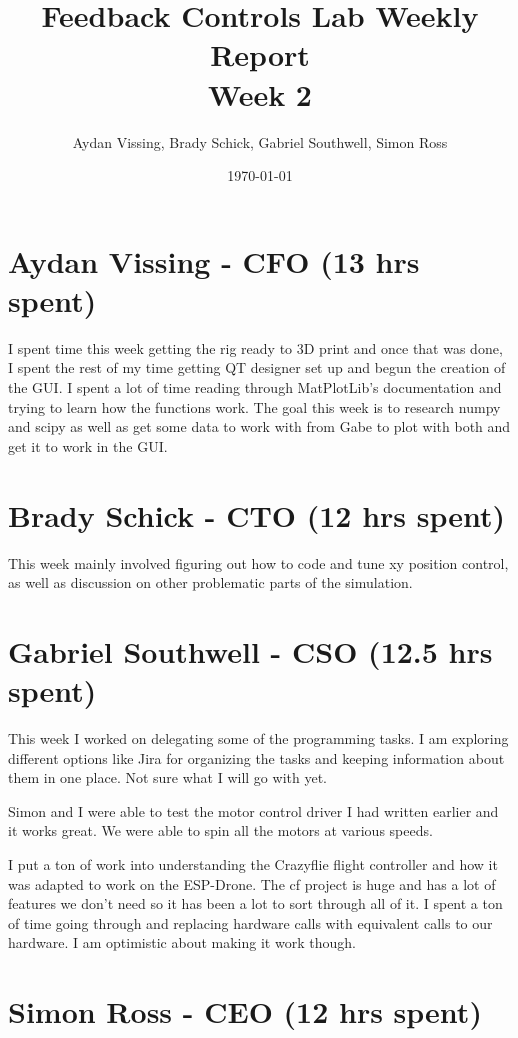 \documentclass[12pt, titlepage]{article}
\title{Feedback Controls Lab Weekly Report \\ \normalsize{Week 2}}
\author{Aydan Vissing, Brady Schick, Gabriel Southwell, Simon Ross}
\date{\today}
\begin{document}
\maketitle

\section*{Aydan Vissing - CFO (13 hrs spent)}

I spent time this week getting the rig ready to 3D print and once that was done, I spent the rest of my time getting QT designer set up and begun the creation of the GUI. I spent a lot of time reading through MatPlotLib's documentation and trying to learn how the functions work. The goal this week is to research numpy and scipy as well as get some data to work with from Gabe to plot with both and get it to work in the GUI. 

\section*{Brady Schick - CTO (12 hrs spent)}

This week mainly involved figuring out how to code and tune xy position control, as well as discussion on other problematic parts of the simulation.

\section*{Gabriel Southwell - CSO (12.5 hrs spent)}

This week I worked on delegating some of the programming tasks. I am exploring different options like Jira for organizing the tasks and keeping information about them in one place. Not sure what I will go with yet. 

Simon and I were able to test the motor control driver I had written earlier and it works great. We were able to spin all the motors at various speeds.

I put a ton of work into understanding the Crazyflie flight controller and how it was adapted to work on the ESP-Drone. The cf project is huge and has a lot of features we don't need so it has been a lot to sort through all of it. I spent a ton of time going through and replacing hardware calls with equivalent calls to our hardware. I am optimistic about making it work though. 

\section*{Simon Ross - CEO (12 hrs spent)}
\end{document}
